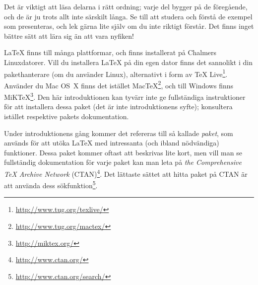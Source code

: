 \documentclass[lang=sv,ptsize=10pt,font=none,nomath,titles=bf,../../a4.tex]{subfiles}
\begin{document}
Det är viktigt att läsa delarna i rätt ordning; varje del bygger på de
föregående, och de är ju trots allt inte särskilt långa. Se till att
studera och förstå de exempel som presenteras, och lek gärna lite själv
om du inte riktigt förstår. Det finns inget bättre sätt att lära sig än
att vara nyfiken!

\LaTeX{} finns till många plattformar, och finns installerat på Chalmers
Linux\-da\-to\-rer. Vill du installera \LaTeX{} på din egen dator finns det
sannolikt i din pakethanterare (om du använder Linux), alternativt i form
av \TeX{} Live\footnote{\url{http://www.tug.org/texlive/}}. Använder du
Mac OS~X finns det istället
Mac\TeX\footnote{\url{http://www.tug.org/mactex/}}, och till Windows finns
MiK\TeX\footnote{\url{http://miktex.org/}}. Den här introduktionen kan
tyvärr inte ge fullständiga instruktioner för att installera dessa paket
(det är inte introduktionens syfte);
konsultera istället respektive pakets dokumentation.

Under introduktionens gång kommer det refereras till så kallade
\emph{paket}, som används för att utöka \LaTeX{} med intressanta (och
ibland nödvändiga) funktioner. Dessa paket kommer oftast att beskrivas
lite kort, men vill man se fullständig dokumentation för varje paket
kan man leta på \emph{the Comprehensive \TeX{} Archive Network}
(CTAN)\footnote{\url{http://www.ctan.org/}\label{sec:ctan}}.
Det lättaste sättet att hitta paket på CTAN är att använda dess
sökfunktion\footnote{\url{http://www.ctan.org/search/}}.
\end{document}
